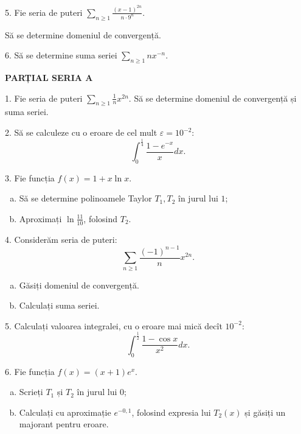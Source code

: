 \documentclass[11pt,a4paper]{article}
\newcommand\ds{\displaystyle}
\theoremstyle{dotless}
\theoremstyle{dotlessdr}
\begin{document}
\vspace{1cm}

5. Fie seria de puteri $\ds\sum_{n \geq 1} \frac{(x - 1)^{2n}}{n \cdot 9^n}$.

Să se determine domeniul de convergență.

\vspace{1cm}

6. Să se determine suma seriei $\ds\sum_{n \geq 1} nx^{-n}$.

\newpage

\textbf{PARȚIAL SERIA A}

1. Fie seria de puteri $\ds\sum_{n \geq 1} \frac{1}{n} x^{2n}$.
Să se determine domeniul de convergență și suma seriei.

\vspace{1cm}

2. Să se calculeze cu o eroare de cel mult $\varepsilon = 10^{-2}$:
\[
  \int_0^{\frac{1}{4}} \frac{1 - e^{-x}}{x} dx.
\]

\vspace{1cm}

3. Fie funcția $f(x) = 1 + x \ln x$.
\begin{enumerate}[(a)]
\item Să se determine polinoamele Taylor $T_1, T_2$ în jurul lui $1$;
\item Aproximați $\ln \frac{11}{10}$, folosind $T_2$.
\end{enumerate}

\vspace{1cm}

4. Considerăm seria de puteri:
\[
  \sum_{n \geq 1} \frac{(-1)^{n-1}}{n} x^{2n}.
\]

\begin{enumerate}[(a)]
\item Găsiți domeniul de convergență.
\item Calculați suma seriei.
\end{enumerate}

\vspace{1cm}

5. Calculați valoarea integralei, cu o eroare mai mică decît $10^{-2}$:
\[
  \int_0^{\frac{1}{2}} \frac{1 - \cos x}{x^2} dx.
\]

\vspace{1cm}

6. Fie funcția $f(x) = (x + 1)e^x$.
\begin{enumerate}[(a)]
\item Scrieți $T_1$ și $T_2$ în jurul lui $0$;
\item Calculați cu aproximație $e^{-0,1}$, folosind expresia lui $T_2(x)$
  și găsiți un majorant pentru eroare.
\end{enumerate}
\end{document}
